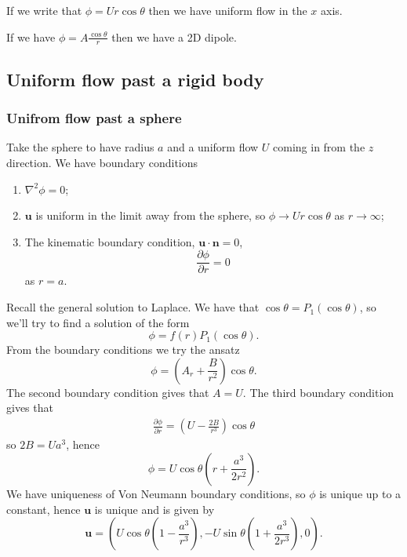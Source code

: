 \documentclass{article}
\begin{document}
\begin{example}
  If we write that $ \phi = Ur\cos \theta $ then we have uniform flow in the $ x $ axis.
\end{example}
\begin{example}
	If we have $ \phi = A\frac{\cos\theta}r $ then we have a 2D dipole.
\end{example}
\subsection{Uniform flow past a rigid body}
\subsubsection{Unifrom flow past a sphere}
Take the sphere to have radius $ a $ and a uniform flow $ U $ coming in from the $ z $ direction. We have boundary conditions
\begin{enumerate}
	\item $ \nabla^2\phi = 0 $;
	\item $ \mathbf u $ is uniform in the limit away from the sphere, so $ \phi\to Ur\cos\theta $ as $ r\to\infty $;
	\item The kinematic boundary condition, $ \mathbf u\cdot\mathbf n = 0 $,
		\[
			\frac{\partial \phi}{\partial r} = 0
		\]
		as $ r=a $.
\end{enumerate}
Recall the general solution to Laplace. We have that $ \cos\theta = P_1(\cos\theta) $, so we'll try to find a solution of the form
\[
  \phi = f(r)P_1(\cos\theta).
\]
From the boundary conditions we try the ansatz
\[
	\phi = \left(A_r + \frac B{r^2}\right)\cos\theta.
\]
The second boundary condition gives that $ A = U $. The third boundary condition gives that
\begin{align*}
	\frac{\partial \phi}{\partial r} = \left(U - \frac{ 2B}{r^3}\right)\cos\theta
\end{align*}
so $ 2B = Ua^3 $, hence
\[
	\phi = U\cos\theta\left(r+ \frac{a^3}{2r^2}\right).
\]
We have uniqueness of Von Neumann boundary conditions, so $ \phi $ is unique up to a constant, hence $ \mathbf u $ is unique and is given by
\[
	\mathbf u = \left(U\cos\theta\left(1-\frac{a^3}{r^3}\right), -U\sin\theta\left(1+\frac{a^3}{2r^3}\right),0\right).
\]
\end{document}
